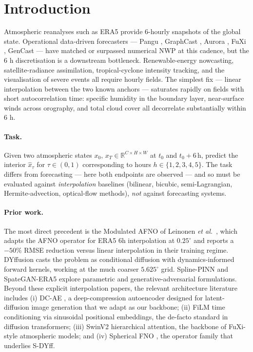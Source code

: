 \documentclass[10pt,letterpaper,twocolumn]{article}
\begin{document}
\section{Introduction}

Atmospheric reanalyses such as ERA5 \cite{hersbach2020era5} provide
6-hourly snapshots of the global state. Operational data-driven
forecasters --- Pangu \cite{bi2022pangu}, GraphCast \cite{lam2023graphcast},
Aurora \cite{bodnar2024aurora}, FuXi \cite{chen2023fuxi}, GenCast
\cite{price2024genwc} --- have matched or surpassed numerical NWP at
this cadence, but the 6 h discretisation is a downstream bottleneck.
Renewable-energy nowcasting, satellite-radiance assimilation,
tropical-cyclone intensity tracking, and the visualisation of severe
events all require hourly fields. The simplest fix --- linear
interpolation between the two known anchors --- saturates rapidly on
fields with short autocorrelation time: specific humidity in the
boundary layer, near-surface winds across orography, and total cloud
cover all decorrelate substantially within 6 h.

\paragraph{Task.}
Given two atmospheric states $x_0,\,x_T\in\mathbb{R}^{C\times H\times W}$
at $t_0$ and $t_0{+}6\,$h, predict the interior $\hat x_\tau$ for
$\tau\in(0,1)$ corresponding to hours $h\in\{1,2,3,4,5\}$. The task
differs from forecasting --- here both endpoints are observed --- and so
must be evaluated against \emph{interpolation} baselines (bilinear,
bicubic, semi-Lagrangian, Hermite-advection, optical-flow methods),
\emph{not} against forecasting systems.

\paragraph{Prior work.}
The most direct precedent is the Modulated AFNO of Leinonen \emph{et al.}\
\cite{leinonen2024modafno}, which adapts the AFNO operator
\cite{guibas2022afno} for ERA5 6h interpolation at $0.25^\circ$ and
reports a $-50\%$ RMSE reduction versus linear interpolation in their
training regime. DYffusion \cite{cachay2023dyffusion} casts the problem
as conditional diffusion with dynamics-informed forward kernels, working
at the much coarser $5.625^\circ$ grid. Spline-PINN
\cite{wandel2022splinepinn} and SpateGAN-ERA5 \cite{vandeschrik2024spategan}
explore parametric and generative-adversarial formulations. Beyond these
explicit interpolation papers, the relevant architecture literature
includes (i) DC-AE \cite{xie2024dcae}, a deep-compression autoencoder
designed for latent-diffusion image generation that we adapt as our
backbone; (ii) FiLM \cite{peebles2023dit,esser2024sd3} time conditioning
via sinusoidal positional embeddings, the de-facto standard in
diffusion transformers; (iii) SwinV2 \cite{liu2022swinv2} hierarchical
attention, the backbone of FuXi-style atmospheric models; and (iv)
Spherical FNO \cite{bonev2023sfno}, the operator family that underlies
S-DYff.
\end{document}
